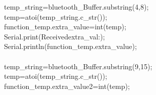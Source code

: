 \documentclass[a4paper, 12pt]{article}
\newcommand\SPC{\hspace*{0.6em}}
\newcommand\TAB{\hspace*{1.2em}}
\newcommand\QOT{\mbox{\char 34}}
\newcommand{\CppAIdentifier}[1]{\textcolor[rgb]{0,1,0}{#1}}
\newcommand{\CppANumber}[1]{\textcolor[rgb]{0,0,1}{#1}}
\newcommand{\CppAReservedWord}[1]{\textcolor[rgb]{0,0.5,0}{#1}}
\newcommand{\CppASpace}[1]{\textcolor[rgb]{1,1,1}{\colorbox[rgb]{0,0,0}{#1}}}
\newcommand{\CppAString}[1]{\textcolor[rgb]{0.76,0.76,0.76}{#1}}
\newcommand{\CppASymbol}[1]{\textcolor[rgb]{1,0,0}{#1}}
\begin{document}
\begin{ttfamily}
\CppASpace{\SPC \SPC \SPC \SPC \SPC \SPC \SPC \SPC \SPC \SPC \SPC \SPC \SPC \SPC }\CppAIdentifier{temp\_string}\CppASymbol{=}\CppAIdentifier{bluetooth\_Buffer}\CppASymbol{.}\CppAIdentifier{substring}\CppASymbol{(}\CppANumber{4}\CppASymbol{,}\CppANumber{8}\CppASymbol{)}\CppASymbol{;}\CppASpace{\SPC }\\
\CppASpace{\SPC \SPC \SPC \SPC \SPC \SPC \SPC \SPC \SPC \SPC \SPC \SPC \SPC \SPC }\CppAIdentifier{temp}\CppASymbol{=}\CppAIdentifier{atoi}\CppASymbol{(}\CppAIdentifier{temp\_string}\CppASymbol{.}\CppAIdentifier{c\_str}\CppASymbol{(}\CppASymbol{)}\CppASymbol{)}\CppASymbol{;}\\
\CppASpace{\SPC \SPC \SPC \SPC \SPC \SPC \SPC \SPC \SPC \SPC \SPC \SPC \SPC \SPC }\CppAIdentifier{function\_temp}\CppASymbol{.}\CppAIdentifier{extra\_value}\CppASpace{\SPC }\CppASymbol{=}\CppASpace{\SPC }\CppAReservedWord{int}\CppASymbol{(}\CppAIdentifier{temp}\CppASymbol{)}\CppASymbol{;}\\
\CppASpace{\SPC \SPC \SPC \SPC \SPC \SPC \SPC \SPC \SPC \SPC \SPC \SPC \SPC \SPC }\CppAIdentifier{Serial}\CppASymbol{.}\CppAIdentifier{print}\CppASymbol{(}\CppAString{\QOT Received\SPC extra\_val\SPC :\SPC \QOT }\CppASymbol{)}\CppASymbol{;}\\
\CppASpace{\SPC \SPC \SPC \SPC \SPC \SPC \SPC \SPC \SPC \SPC \SPC \SPC \SPC \SPC }\CppAIdentifier{Serial}\CppASymbol{.}\CppAIdentifier{println}\CppASymbol{(}\CppAIdentifier{function\_temp}\CppASymbol{.}\CppAIdentifier{extra\_value}\CppASymbol{)}\CppASymbol{;}\\
\CppASpace{\SPC \SPC \SPC \SPC \SPC \SPC \SPC \SPC \SPC \SPC \SPC \SPC \SPC \SPC \SPC \SPC \SPC \SPC \SPC \SPC \SPC \SPC \SPC \SPC \SPC \SPC \SPC \SPC }\\
\CppASpace{\TAB \TAB \TAB \SPC \SPC \SPC \SPC \SPC \SPC \SPC \SPC }\CppAIdentifier{temp\_string}\CppASymbol{=}\CppAIdentifier{bluetooth\_Buffer}\CppASymbol{.}\CppAIdentifier{substring}\CppASymbol{(}\CppANumber{9}\CppASymbol{,}\CppANumber{15}\CppASymbol{)}\CppASymbol{;}\\
\CppASpace{\SPC \SPC \SPC \SPC \SPC \SPC \SPC \SPC \SPC \SPC \SPC \SPC \SPC \SPC }\CppAIdentifier{temp}\CppASymbol{=}\CppAIdentifier{atoi}\CppASymbol{(}\CppAIdentifier{temp\_string}\CppASymbol{.}\CppAIdentifier{c\_str}\CppASymbol{(}\CppASymbol{)}\CppASymbol{)}\CppASymbol{;}\\
\CppASpace{\SPC \SPC \SPC \SPC \SPC \SPC \SPC \SPC \SPC \SPC \SPC \SPC \SPC \SPC }\CppAIdentifier{function\_temp}\CppASymbol{.}\CppAIdentifier{extra\_value2}\CppASpace{\SPC }\CppASymbol{=}\CppASpace{\SPC }\CppAReservedWord{int}\CppASymbol{(}\CppAIdentifier{temp}\CppASymbol{)}\CppASymbol{;}\\

\end{ttfamily}
\end{document}
